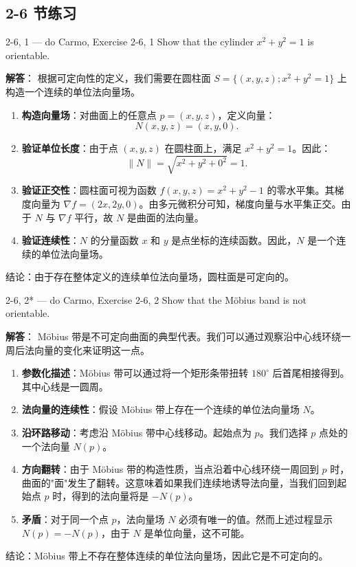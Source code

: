 \subsection*{2-6 节练习}

\begin{exercise}{2-6, 1 — do Carmo, Exercise 2-6, 1}
Show that the cylinder $x^2 + y^2 = 1$ is orientable.
\end{exercise}

\begin{solution}
\textbf{解答}：
根据可定向性的定义，我们需要在圆柱面 $S = \{(x,y,z); x^2 + y^2 = 1\}$ 上构造一个连续的单位法向量场。

\begin{enumerate}
    \item \textbf{构造向量场}：对曲面上的任意点 $p = (x, y, z)$，定义向量：
    \[
    N(x, y, z) = (x, y, 0).
    \]
    \item \textbf{验证单位长度}：由于点 $(x, y, z)$ 在圆柱面上，满足 $x^2 + y^2 = 1$。因此：
    \[
    \|N\| = \sqrt{x^2 + y^2 + 0^2} = 1.
    \]
    \item \textbf{验证正交性}：圆柱面可视为函数 $f(x, y, z) = x^2 + y^2 - 1$ 的零水平集。其梯度向量为 $\nabla f = (2x, 2y, 0)$。由多元微积分可知，梯度向量与水平集正交。由于 $N$ 与 $\nabla f$ 平行，故 $N$ 是曲面的法向量。
    \item \textbf{验证连续性}：$N$ 的分量函数 $x$ 和 $y$ 是点坐标的连续函数。因此，$N$ 是一个连续的单位法向量场。
\end{enumerate}
结论：由于存在整体定义的连续单位法向量场，圆柱面是可定向的。
\end{solution}

\begin{exercise}{2-6, 2* — do Carmo, Exercise 2-6, 2}
Show that the Möbius band is not orientable.
\end{exercise}

\begin{solution}
\textbf{解答}：
Möbius 带是不可定向曲面的典型代表。我们可以通过观察沿中心线环绕一周后法向量的变化来证明这一点。

\begin{enumerate}
    \item \textbf{参数化描述}：Möbius 带可以通过将一个矩形条带扭转 $180^\circ$ 后首尾相接得到。其中心线是一圆周。
    \item \textbf{法向量的连续性}：假设 Möbius 带上存在一个连续的单位法向量场 $N$。
    \item \textbf{沿环路移动}：考虑沿 Möbius 带中心线移动。起始点为 $p$。我们选择 $p$ 点处的一个法向量 $N(p)$。
    \item \textbf{方向翻转}：由于 Möbius 带的构造性质，当点沿着中心线环绕一周回到 $p$ 时，曲面的"面"发生了翻转。这意味着如果我们连续地诱导法向量，当我们回到起始点 $p$ 时，得到的法向量将是 $-N(p)$。
    \item \textbf{矛盾}：对于同一个点 $p$，法向量场 $N$ 必须有唯一的值。然而上述过程显示 $N(p) = -N(p)$，由于 $N$ 是单位向量，这不可能。
\end{enumerate}
结论：Möbius 带上不存在整体连续的单位法向量场，因此它是不可定向的。
\end{solution}

